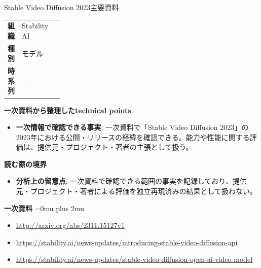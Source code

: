 \begin{technicalnote}{Stable Video Diffusion 2023}{主要資料}
\begingroup
\begin{tabularx}{\linewidth}{@{}>{\bfseries}p{0.22\linewidth}X@{}}
組織 & Stability AI \\
種別 & モデル \\
時系列 & — \\
\end{tabularx}
\smallskip
{\bfseries 一次資料から整理したtechnical points}
\begin{itemize}[leftmargin=1.5em,itemsep=0.35em]
\item \textbf{一次情報で確認できる事実}: 一次資料で「Stable Video Diffusion 2023」の2023年における公開・リリースの経緯を確認できる。能力や性能に関する評価は、提供元・プロジェクト・著者の主張として扱う。
\end{itemize}
\begin{minipage}{\linewidth}
{\bfseries 読む際の境界}
\begin{itemize}[leftmargin=1.5em,itemsep=0.35em]
\item \textbf{分析上の留意点}: 一次資料で確認できる範囲の事実を記録しており、提供元・プロジェクト・著者による評価を独立再現済みの結果として扱わない。
\end{itemize}
\begin{samepage}
{\bfseries 一次資料}
\begingroup\sloppy
\Urlmuskip=0mu plus 2mu\relax
\begin{itemize}[leftmargin=1.5em,itemsep=0.25em]
\item {\scriptsize\url{http://arxiv.org/abs/2311.15127v1}}
\item {\scriptsize\url{https://stability.ai/news-updates/introducing-stable-video-diffusion-api}}
\item {\scriptsize\url{https://stability.ai/news-updates/stable-video-diffusion-open-ai-video-model}}
\end{itemize}
\endgroup
\end{samepage}
\end{minipage}
\endgroup
\end{technicalnote}
\medskip

